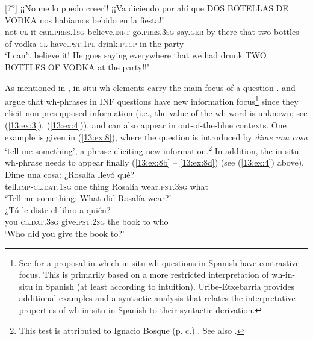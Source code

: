 \documentclass[output=paper,colorlinks,citecolor=brown,draftmode]{langscibook}
\begin{document}
\ea  \label{13:ex:7}%
[??]{
\gll ¡¡No me lo puedo           creer!! ¡¡Va diciendo por ahí  que DOS BOTELLAS DE VODKA nos habíamos       bebido en la fiesta!!\\
not \textsc{cl}   it can.\textsc{pres}.1\textsc{sg} believe.\textsc{inft} go.\textsc{pres}.3\textsc{sg} say.\textsc{ger}   by there that  two bottles         of   vodka       \textsc{cl}  have.\textsc{pst}.1\textsc{pl} drink.\textsc{ptcp}   in the party\\ 
\glt ‘I can’t believe it! He goes saying everywhere that we had drunk TWO BOTTLES OF VODKA at the party!!’\\
}
\z


As mentioned in , in-situ wh-elements carry the main focus of a question \citep{Horvath1986,Rochemont1986,Tuller1992,Zubizarreta1998,escandellvidal1999}. \citet{Reglero2007} and \citet{RegleroTicio2013} argue that wh-phrases in INF questions have new information focus\footnote{See \citet{Uribe-Etxebarria2002} for a proposal in which in situ wh-questions in Spanish have contrastive focus. This is primarily based on a more restricted interpretation of wh-in-situ in Spanish (at least according to  intuition). Uribe-Etxebarria provides additional examples and a syntactic analysis that relates the interpretative properties of wh-in-situ in Spanish to their syntactic derivation.}  since they elicit non-presupposed information (i.e., the value of the wh-word is unknown; see (\ref{13:ex:3}), (\ref{13:ex:4})), and can also appear in out-of-the-blue contexts. One example is given in (\ref{13:ex:8}), where the question is introduced by \textit{dime una cosa} ‘tell me something’, a phrase eliciting new information.\footnote{This test is attributed to Ignacio Bosque (p. c.) \citep{RegleroTicio2013}. See also \citet{gonzalez2018dime,gonzalez_reglero2020}.}  In addition, the in situ wh-phrase needs to appear finally (\ref{13:ex:8b} -- \ref{13:ex:8d}) (see (\ref{13:ex:4}) above).\\

\ea \label{13:ex:8}%
\ea  \label{13:ex:8a}  \gll Dime una cosa: ¿Rosalía llevó  qué?\\
tell.\textsc{imp}-\textsc{cl}.\textsc{dat}.1\textsc{sg} one thing   Rosalía wear.\textsc{pst}.3\textsc{sg}  what\\
\glt ‘Tell me something: What did Rosalía wear?’\\

\ex  \label{13:ex:8b}
\gll ¿Tú le diste el libro a quién? \\
you \textsc{cl}.\textsc{dat}.3\textsc{sg} give.\textsc{pst}.2\textsc{sg} the book to who\\
\glt ‘Who did you give the book to?’\\
\end{document}
